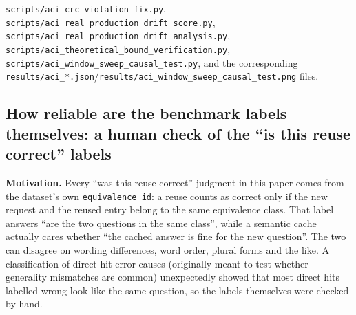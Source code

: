 \documentclass[11pt]{article}
\begin{document}
\texttt{scripts/\allowbreak{}aci\_\allowbreak{}crc\_\allowbreak{}violation\_\allowbreak{}fix.\allowbreak{}py}, \texttt{scripts/\allowbreak{}aci\_\allowbreak{}real\_\allowbreak{}production\_\allowbreak{}drift\_\allowbreak{}score.\allowbreak{}py}, \texttt{scripts/\allowbreak{}aci\_\allowbreak{}real\_\allowbreak{}production\_\allowbreak{}drift\_\allowbreak{}analysis.\allowbreak{}py}, \texttt{scripts/\allowbreak{}aci\_\allowbreak{}theoretical\_\allowbreak{}bound\_\allowbreak{}verification.\allowbreak{}py}, \texttt{scripts/\allowbreak{}aci\_\allowbreak{}window\_\allowbreak{}sweep\_\allowbreak{}causal\_\allowbreak{}test.\allowbreak{}py}, and the corresponding \texttt{results/\allowbreak{}aci\_\allowbreak{}*.\allowbreak{}json}/\texttt{results/\allowbreak{}aci\_\allowbreak{}window\_\allowbreak{}sweep\_\allowbreak{}causal\_\allowbreak{}test.\allowbreak{}png} files.

\subsection{How reliable are the benchmark labels themselves: a human check of the ``is this reuse correct'' labels}
\label{sec:labelnoise}

\textbf{Motivation.} Every ``was this reuse correct'' judgment in this paper comes from the dataset's own \texttt{equivalence\_\allowbreak{}id}: a reuse counts as correct only if the new request and the reused entry belong to the same equivalence class. That label answers ``are the two questions in the same class'', while a semantic cache actually cares whether ``the cached answer is fine for the new question''. The two can disagree on wording differences, word order, plural forms and the like. A classification of direct-hit error causes (originally meant to test whether generality mismatches are common) unexpectedly showed that most direct hits labelled wrong look like the same question, so the labels themselves were checked by hand.
\end{document}
